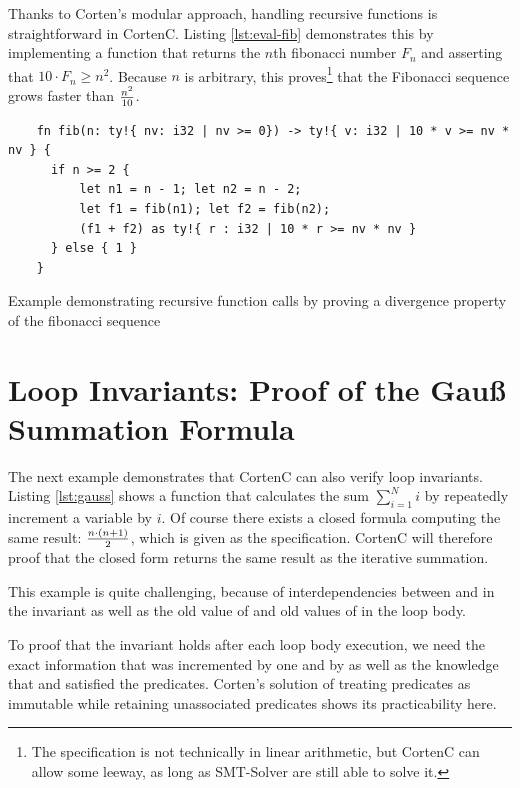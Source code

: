 \documentclass[twoside, english, final]{sdqthesis}
\theoremstyle{definition}
\begin{document}
Thanks to Corten's modular approach, handling recursive functions is straightforward in CortenC. Listing \ref{lst:eval-fib} demonstrates this by implementing a function that returns the $n$th fibonacci number $F_n$ and asserting that $10\cdot F_n \geq n^2$. Because $n$ is arbitrary, this proves\footnote{The specification is not technically in linear arithmetic, but CortenC can allow some leeway, as long as SMT-Solver are still able to solve it.} that the Fibonacci sequence grows faster than $n^2\over10$.


\begin{listing}[h]
  \begin{verbatim}
    fn fib(n: ty!{ nv: i32 | nv >= 0}) -> ty!{ v: i32 | 10 * v >= nv * nv } {
      if n >= 2 {
          let n1 = n - 1; let n2 = n - 2;
          let f1 = fib(n1); let f2 = fib(n2);
          (f1 + f2) as ty!{ r : i32 | 10 * r >= nv * nv }
      } else { 1 }
    }
  \end{verbatim}
  \caption{Example demonstrating recursive function calls by proving a divergence property of the fibonacci sequence}
  \label{lst:eval-fib}
\end{listing}


\section{Loop Invariants: Proof of the Gauß Summation Formula}\label{sec:evaluation-gauss} 

The next example demonstrates that CortenC can also verify loop invariants. Listing \ref{lst:gauss} shows a function that calculates the sum $\sum_{i = 1}^N i$ by repeatedly increment a variable by $i$. 
Of course there exists a closed formula computing the same result: $n \cdot (n + 1) \over 2$, which is given as the specification. CortenC will therefore proof that the closed form returns the same result as the iterative summation.

This example is quite challenging, because of interdependencies between  and  in the invariant as well as the old value of  and old values of  in the loop body. 

To proof that the invariant holds after each loop body execution, we need the exact information that  was incremented by one and  by  as well as the knowledge that  and  satisfied the predicates. 
Corten's solution of treating predicates as immutable while retaining unassociated predicates shows its practicability here. 
\end{document}
